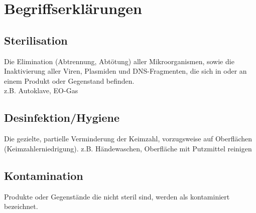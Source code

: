 \section{Begriffserklärungen}

\subsection{Sterilisation}
Die Elimination (Abtrennung, Abtötung) aller Mikroorganismen, sowie die
Inaktivierung aller Viren, Plasmiden und DNS-Fragmenten, die sich in oder an einem Produkt oder Gegenstand befinden.\\
z.B. Autoklave, EO-Gas

\subsection{Desinfektion/Hygiene}
Die gezielte, partielle Verminderung der Keimzahl, vorzugsweise auf
Oberflächen (Keimzahlerniedrigung).
z.B. Händewaschen, Oberfläche mit Putzmittel reinigen

\subsection{Kontamination}
Produkte oder Gegenstände die nicht steril sind, werden als kontaminiert
bezeichnet.


